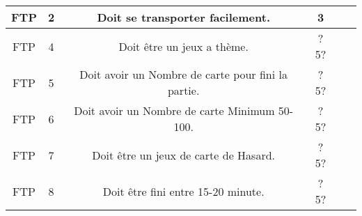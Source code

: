 \begin{center}
{\begin{tabular}{|c|c|c|c|c|c|}
			 FTP  &   2   &                    Doit se transporter facilement.                     &     3     &                   &                              \\ \hline
			 FTP  &   4   &                       Doit être un jeux a thème.                       &    ?5?    &                   &                              \\ \hline
			 FTP  &   5   &           Doit avoir un Nombre de carte pour fini la partie.           &    ?5?    &                   &                              \\ \hline
			 FTP  &   6   &             Doit avoir un Nombre de carte Minimum 50-100.              &    ?5?    &                   &                              \\ \hline
			 FTP  &   7   &                 Doit être un jeux de carte de Hasard.                  &    ?5?    &                   &                              \\ \hline
			 FTP  &   8   &                   Doit être fini entre 15-20 minute.                   &    ?5?    &                   &                              \\ \hline
		\end{tabular}
	}
\end{center}